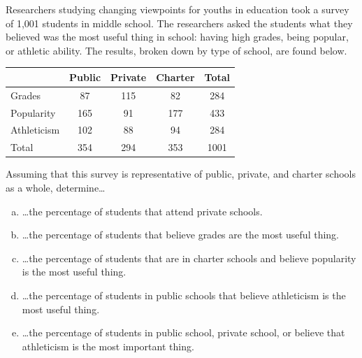 \documentclass[12pt,letterpaper]{exam}
\begin{document}
\examtitle
{} 
\scores
\bottomline
\newpage

\begin{questions}

\newpage
\question[15] Researchers studying changing viewpoints for youths in education took a survey of 1,001 students in middle school. The researchers asked the students what they believed was the most useful thing in school: having high grades, being popular, or athletic ability. The results, broken down by type of school, are found below. \par
	\begin{table}[!ht]
	\centering
	\begin{tabular}{| l || c | c | c || c |} \hline 
	& Public & Private & Charter & Total \\ \hline \hline
	Grades & 87 & 115 & 82 & 284 \\ \hline
	Popularity & 165 & 91 & 177 & 433 \\ \hline
	Athleticism & 102 & 88 & 94 & 284 \\ \hline \hline
	Total & 354 & 294 & 353 & 1001 \\ \hline
	\end{tabular}
	\end{table} \par
Assuming that this survey is representative of public, private, and charter schools as a whole, determine\dots

\begin{enumerate}[(a)]
\item \dots the percentage of students that attend private schools. 
\item \dots the percentage of students that believe grades are the most useful thing. 
\item \dots the percentage of students that are in charter schools and believe popularity is the most useful thing. 
\item \dots the percentage of students in public schools that believe athleticism is the most useful thing. 
\item \dots the percentage of students in public school, private school, or believe that athleticism is the most important thing. 
\end{enumerate}




\end{questions}
\end{document}
